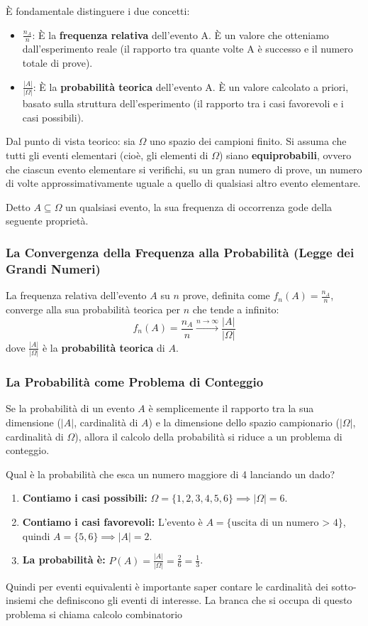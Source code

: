 È fondamentale distinguere i due concetti:
\begin{itemize}
    \item $\frac{n_A}{n}$: È la \textbf{frequenza relativa} dell'evento A. È un valore che otteniamo dall'esperimento reale (il rapporto tra quante volte A è successo e il numero totale di prove).
    \item $\frac{|A|}{|\Omega|}$: È la \textbf{probabilità teorica} dell'evento A. È un valore calcolato a priori, basato sulla struttura dell'esperimento (il rapporto tra i casi favorevoli e i casi possibili).
\end{itemize}



Dal punto di vista teorico: sia $\Omega$ uno spazio dei campioni finito. Si assuma che tutti gli eventi elementari (cioè, gli elementi di $\Omega$) siano \textbf{equiprobabili}, ovvero che ciascun evento elementare si verifichi, su un gran numero di prove, un numero di volte approssimativamente uguale a quello di qualsiasi altro evento elementare.

Detto $A \subseteq \Omega$ un qualsiasi evento, la sua frequenza di occorrenza gode della seguente proprietà.

\subsubsection{La Convergenza della Frequenza alla Probabilità (Legge dei Grandi Numeri)}
La frequenza relativa dell'evento $A$ su $n$ prove, definita come $f_n(A) = \frac{n_A}{n}$, converge alla sua probabilità teorica per $n$ che tende a infinito:
\[ f_n(A) = \frac{n_A}{n} \xrightarrow{n \to \infty} \frac{|A|}{|\Omega|} \]
dove $\frac{|A|}{|\Omega|}$ è la \textbf{probabilità teorica} di $A$.

\subsubsection{La Probabilità come Problema di Conteggio}
Se la probabilità di un evento $A$ è semplicemente il rapporto tra la sua dimensione ($|A|$, cardinalità di $A$) e la dimensione dello spazio campionario ($|\Omega|$, cardinalità di $\Omega$), allora il calcolo della probabilità si riduce a un problema di conteggio.

\begin{esempio}
Qual è la probabilità che esca un numero maggiore di 4 lanciando un dado?
    \begin{enumerate}
        \item \textbf{Contiamo i casi possibili:} $\Omega = \{1, 2, 3, 4, 5, 6\} \implies |\Omega| = 6$.
        \item \textbf{Contiamo i casi favorevoli:} L'evento è $A = \{\text{uscita di un numero > 4}\}$, quindi $A = \{5, 6\} \implies |A| = 2$.
        \item \textbf{La probabilità è:} $P(A) = \frac{|A|}{|\Omega|} = \frac{2}{6} = \frac{1}{3}$.
    \end{enumerate}
\end{esempio}

Quindi per eventi equivalenti è importante saper contare le cardinalità dei sotto-insiemi che definiscono gli eventi di interesse.
La branca che si occupa di questo problema si chiama calcolo combinatorio
